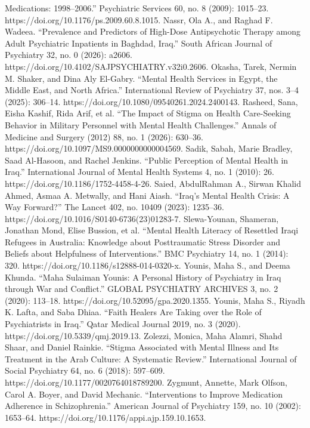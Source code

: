 \documentclass[12pt,a4paper]{article}
\begin{document}
Medications: 1998–2006.” Psychiatric Services 60, no. 8 (2009): 1015–23. https://doi.org/10.1176/ps.2009.60.8.1015. Nassr, Ola A., and Raghad F. Wadeea. “Prevalence and Predictors of High-Dose Antipsychotic Therapy among Adult Psychiatric Inpatients in Baghdad, Iraq.” South African Journal of Psychiatry 32, no. 0 (2026): a2606. https://doi.org/10.4102/SAJPSYCHIATRY.v32i0.2606. Okasha, Tarek, Nermin M. Shaker, and Dina Aly El-Gabry. “Mental Health Services in Egypt, the Middle East, and North Africa.” International Review of Psychiatry 37, nos. 3–4 (2025): 306–14. https://doi.org/10.1080/09540261.2024.2400143. Rasheed, Sana, Eisha Kashif, Rida Arif, et al. “The Impact of Stigma on Health Care-Seeking Behavior in Military Personnel with Mental Health Challenges.” Annals of Medicine and Surgery (2012) 88, no. 1 (2026): 630–36. https://doi.org/10.1097/MS9.0000000000004569. Sadik, Sabah, Marie Bradley, Saad Al-Hasoon, and Rachel Jenkins. “Public Perception of Mental Health in Iraq.” International Journal of Mental Health Systems 4, no. 1 (2010): 26. https://doi.org/10.1186/1752-4458-4-26. Saied, AbdulRahman A., Sirwan Khalid Ahmed, Asmaa A. Metwally, and Hani Aiash. “Iraq’s Mental Health Crisis: A Way Forward?” The Lancet 402, no. 10409 (2023): 1235–36. https://doi.org/10.1016/S0140-6736(23)01283-7. Slewa-Younan, Shameran, Jonathan Mond, Elise Bussion, et al. “Mental Health Literacy of Resettled Iraqi Refugees in Australia: Knowledge about Posttraumatic Stress Disorder and Beliefs about Helpfulness of Interventions.” BMC Psychiatry 14, no. 1 (2014): 320. https://doi.org/10.1186/s12888-014-0320-x. Younis, Maha S., and Deema Khunda. “Maha Sulaiman Younis: A Personal History of Psychiatry in Iraq through War and Conflict.” GLOBAL PSYCHIATRY ARCHIVES 3, no. 2 (2020): 113–18. https://doi.org/10.52095/gpa.2020.1355. Younis, Maha S., Riyadh K. Lafta, and Saba Dhiaa. “Faith Healers Are Taking over the Role of Psychiatrists in Iraq.” Qatar Medical Journal 2019, no. 3 (2020). https://doi.org/10.5339/qmj.2019.13. Zolezzi, Monica, Maha Alamri, Shahd Shaar, and Daniel Rainkie. “Stigma Associated with Mental Illness and Its Treatment in the Arab Culture: A Systematic Review.” International Journal of Social Psychiatry 64, no. 6 (2018): 597–609. https://doi.org/10.1177/0020764018789200. Zygmunt, Annette, Mark Olfson, Carol A. Boyer, and David Mechanic. “Interventions to Improve Medication Adherence in Schizophrenia.” American Journal of Psychiatry 159, no. 10 (2002): 1653–64. https://doi.org/10.1176/appi.ajp.159.10.1653.
\end{document}
